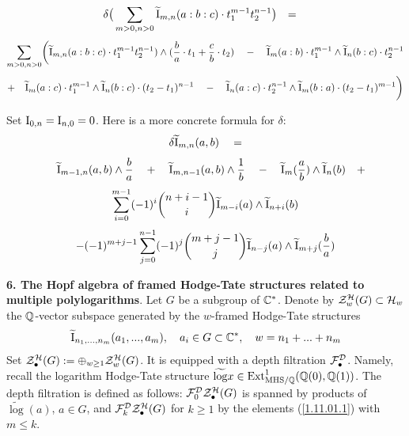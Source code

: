 \documentclass[10pt]{article}
\begin{document}
 
$$%
 \delta \bigr(\sum_{m> 0,n> 0}  {\widetilde {\rm I}}_{m,n}(a:b:c)\cdot t_{1}^{m- 1}t_{2}^{n-1}\bigl) 
 \quad = \quad
$$%
$$
\sum_{m> 0, n > 0} \biggr({\widetilde {\rm I}}_{m,n}(a:b:c)\cdot t_{1}^{m- 1}t_{2}^{n-1})
\wedge (\frac{b}{a}\cdot t_{1} + \frac{c}{b}\cdot t_{2}) \quad - \quad  
{\widetilde {\rm I}}_{m}(a:b) \cdot t_{1}^{m- 1} 
\wedge 
{\widetilde {\rm I}}_{n}(b:c) 
\cdot t_{2}^{n-1} 
$$
$$
 + \quad  {\widetilde {\rm I}}_{m}(a:c) \cdot t_{1}^{m- 1} \wedge {\widetilde {\rm I}}_{n}(b:c) 
\cdot (t_{2} - t_{1})^{n-1} 
\quad - \quad {\widetilde {\rm I}}_{n}(a:c) \cdot t_{2}^{n- 1} \wedge 
{\widetilde {\rm I}}_{m}(b:a) 
\cdot (t_{2} - t_{1})^{m - 1} \biggl) 
$$

Set  ${\rm I}_{0,n} = {\rm I}_{n,0} =0$.  Here is a more concrete formula for  $\delta$:  
$$%
\delta  {\widetilde {\rm I}}_{m,n}(a,b)
\quad = 
$$%
$$
\quad {\widetilde {\rm I}}_{m-1,n}(a,b) \wedge \frac{b}{a} \quad + \quad
{\widetilde {\rm I}}_{m,n-1}(a,b) \wedge \frac{1}{b} \quad 
- \quad {\widetilde {\rm I}}_{m}(\frac{a}{b}) \wedge {\widetilde {\rm I}}_{n}(b) \quad +
$$
$$
\sum_{i=0}^{m-1} (-1)^{i}  \binom{ n+ i - 1 }{ i }  {\widetilde {\rm I}}_{m - i}(a) \wedge {\widetilde {\rm I}}_{n + i}(b) 
$$
$$
 - (-1)^{m+j-1} \sum_{j=0}^{n-1} (-1)^{j}  \binom{ m+ j - 1 }{ j }  {\widetilde {\rm I}}_{n - j}(a) \wedge {\widetilde {\rm I}}_{m + j}(\frac{b}{a})
$$


{\bf 6. The Hopf algebra of framed Hodge-Tate structures related to multiple polylogarithms}. 
Let $G$ be a subgroup of ${\mathbb C}^*$. 
Denote by ${\cal Z}^{\cal H}_{w}(G) \subset {\cal H}_{w}$ the ${\mathbb Q}$-vector subspace 
generated by the $w$-framed Hodge-Tate 
structures 
\begin{equation} \label{1.11.01.1}
\widetilde {\rm I}_{n_1, ..., n_m} (a_1, ..., a_m), \quad a_i \in G \subset {\mathbb C}^*, 
\quad w = n_1 + ... + n_m
\end{equation}
Set ${\cal Z}^{\cal H}_{\bullet}(G):= \oplus_{ w \geq 1} {\cal Z}^{\cal H}_{w}(G)$.  It is equipped with a depth filtration ${\cal F}_{ \bullet}^{{\cal D}}$. Namely, recall 
the logarithm Hodge-Tate structure $\widetilde \log x \in 
{\rm Ext}_{{\rm MHS}/{\mathbb Q}}^1({\mathbb Q}(0), {\mathbb Q}(1))$. The depth filtration is defined as follows: 
${\cal F}_{ 0}^{{\cal D}}{\cal Z}^
{{\cal H}}_{\bullet}(G) $ is spanned by  products of $\widetilde \log (a)$, $a \in G$, and 
$
{\cal F}_{ k}^{{\cal D}}{\cal Z}^{{\cal H}}_{\bullet}(G) 
$ for $k \geq 1$ by the elements  (\ref{1.11.01.1}) with 
$m \leq k$. 
\end{document}
